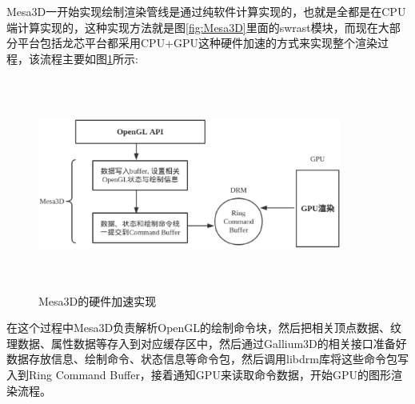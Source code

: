 
Mesa3D一开始实现绘制渲染管线是通过纯软件计算实现的，也就是全都是在CPU端计算实现的，这种实现方法就是图\ref{fig:Mesa3D}里面的swrast模块，而现在大部分平台包括龙芯平台都采用CPU+GPU这种硬件加速的方式来实现整个渲染过程，该流程主要如图\ref{fig:Mesa3D-Flow}所示:

\begin{figure}[H] 
  \centering
  \includegraphics[width=10cm,height=7cm]{figures/chap02/Mesa3D-Flow}
  \caption{Mesa3D的硬件加速实现}
  \label{fig:Mesa3D-Flow}
\end{figure}

在这个过程中Mesa3D负责解析OpenGL的绘制命令块，然后把相关顶点数据、纹理数据、属性数据等存入到对应缓存区中，然后通过Gallium3D的相关接口准备好数据存放信息、绘制命令、状态信息等命令包，然后调用libdrm库将这些命令包写入到Ring Command Buffer，接着通知GPU来读取命令数据，开始GPU的图形渲染流程。


